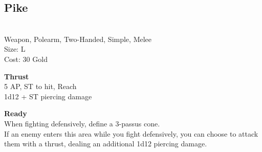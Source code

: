 \subsection{Pike}\label{weapon:pike}\\
Weapon, Polearm, Two-Handed, Simple, Melee\\
Size: L\\
Cost: 30 Gold

\textbf{Thrust}\\
5 AP, ST to hit,  Reach\\
1d12 + \texttimes ST piercing damage

\textbf{Ready}\\
When fighting defensively, define a 3-passus cone.\\
If an enemy enters this area while you fight defensively, you can choose to attack them with a thrust, dealing an additional 1d12 piercing damage.\\

